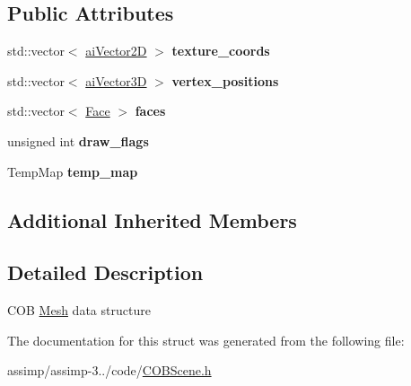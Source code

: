 \subsection*{Public Attributes}
\begin{DoxyCompactItemize}
\item 
\hypertarget{struct_assimp_1_1_c_o_b_1_1_mesh_a705bdcdf87c816f0b07808c5e5e0c8c3}{std\+::vector$<$ \hyperlink{structai_vector2_d}{ai\+Vector2\+D} $>$ {\bfseries texture\+\_\+coords}}\label{struct_assimp_1_1_c_o_b_1_1_mesh_a705bdcdf87c816f0b07808c5e5e0c8c3}

\item 
\hypertarget{struct_assimp_1_1_c_o_b_1_1_mesh_a4e67fc96443c298e3f37346f63de9009}{std\+::vector$<$ \hyperlink{structai_vector3_d}{ai\+Vector3\+D} $>$ {\bfseries vertex\+\_\+positions}}\label{struct_assimp_1_1_c_o_b_1_1_mesh_a4e67fc96443c298e3f37346f63de9009}

\item 
\hypertarget{struct_assimp_1_1_c_o_b_1_1_mesh_ac3db0418de6a9d029c165f8d752c12ce}{std\+::vector$<$ \hyperlink{struct_assimp_1_1_c_o_b_1_1_face}{Face} $>$ {\bfseries faces}}\label{struct_assimp_1_1_c_o_b_1_1_mesh_ac3db0418de6a9d029c165f8d752c12ce}

\item 
\hypertarget{struct_assimp_1_1_c_o_b_1_1_mesh_a7dbd229c568a70dc214ab7f963a3828f}{unsigned int {\bfseries draw\+\_\+flags}}\label{struct_assimp_1_1_c_o_b_1_1_mesh_a7dbd229c568a70dc214ab7f963a3828f}

\item 
\hypertarget{struct_assimp_1_1_c_o_b_1_1_mesh_a80e035282399f4018d48bf76043d85bf}{Temp\+Map {\bfseries temp\+\_\+map}}\label{struct_assimp_1_1_c_o_b_1_1_mesh_a80e035282399f4018d48bf76043d85bf}

\end{DoxyCompactItemize}
\subsection*{Additional Inherited Members}


\subsection{Detailed Description}
C\+O\+B \hyperlink{struct_assimp_1_1_c_o_b_1_1_mesh}{Mesh} data structure 

The documentation for this struct was generated from the following file\+:\begin{DoxyCompactItemize}
\item 
assimp/assimp-\/3../code/\hyperlink{_c_o_b_scene_8h}{C\+O\+B\+Scene.\+h}\end{DoxyCompactItemize}
